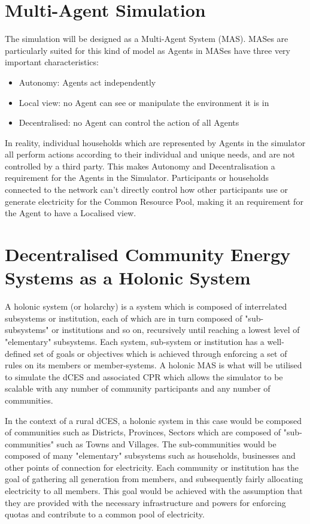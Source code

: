 \section*{Multi-Agent Simulation}
The simulation will be designed as a Multi-Agent System (MAS). MASes are particularly suited for this kind of model as Agents in MASes have three very important characteristics:
\begin{itemize}
	\item Autonomy: Agents act independently
	\item Local view: no Agent can see or manipulate the environment it is in
	\item Decentralised: no Agent can control the action of all Agents
\end{itemize}
In reality, individual households which are represented by Agents in the simulator all perform actions according to their individual and unique needs, and are not controlled by a third party. This makes Autonomy and Decentralisation a requirement for the Agents in the Simulator. Participants or households connected to the network can't directly control how other participants use or generate electricity for the Common Resource Pool, making it an requirement for the Agent to have a Localised view. 

\section*{Decentralised Community Energy Systems as a Holonic System}
A holonic system (or holarchy) is a system which is composed of interrelated subsystems or institution, each of which are in turn composed of "sub-subsystems"  or institutions and so on, recursively until reaching a lowest level of "elementary" subsystems. Each system, sub-system or institution has a well-defined set of goals or objectives which is achieved through enforcing a set of rules on its members or member-systems\cite{Pitt:Holonic_Institutions}. A holonic MAS is what will be utilised to simulate the dCES and associated CPR which allows the simulator to be scalable with any number of community participants and any number of communities. 

In the context of a rural dCES, a holonic system in this case would be composed of communities such as Districts, Provinces, Sectors which are composed of "sub-communities" such as Towns and Villages. The sub-communities would be composed of many "elementary" subsystems such as households, businesses and other points of connection for electricity. Each community or institution has the goal of gathering all generation from members, and subsequently fairly allocating electricity to all members. This goal would be achieved with the assumption that they are provided with the necessary infrastructure and powers for enforcing quotas and contribute to a common pool of electricity.

